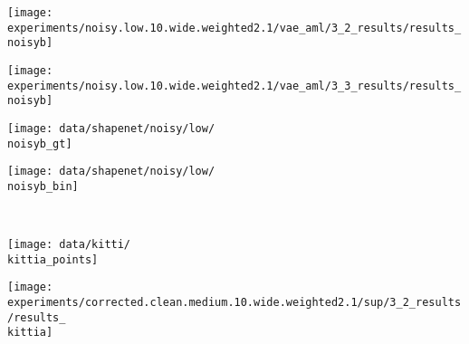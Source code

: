 \begin{minipage}[t]{0.1\textwidth}
    \vspace{0px}\centering
    \texttt{[image: experiments/noisy.low.10.wide.weighted2.1/vae\_aml/3\_2\_results/results\_\\noisyb]}
\end{minipage}
\begin{minipage}[t]{0.1\textwidth}
    \vspace{0px}\centering
    \texttt{[image: experiments/noisy.low.10.wide.weighted2.1/vae\_aml/3\_3\_results/results\_\\noisyb]}
\end{minipage}
\begin{minipage}[t]{0.1\textwidth}
    \vspace{0px}\centering
    \texttt{[image: data/shapenet/noisy/low/\\noisyb\_gt]}
\end{minipage}
\begin{minipage}[t]{0.1\textwidth}
    \vspace{0px}\centering
    \texttt{[image: data/shapenet/noisy/low/\\noisyb\_bin]}
\end{minipage}
\\
\begin{minipage}[t]{0.02\textwidth}
    \vspace{0px}\centering
\end{minipage}
\begin{minipage}[t]{0.1\textwidth}
    \vspace{0px}\centering
    \texttt{[image: data/kitti/\\kittia\_points]}
\end{minipage}
\begin{minipage}[t]{0.1\textwidth}
    \vspace{0px}\centering
    \texttt{[image: experiments/corrected.clean.medium.10.wide.weighted2.1/sup/3\_2\_results/results\_\\kittia]}
\end{minipage}
